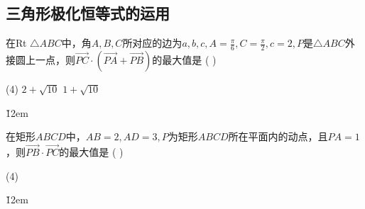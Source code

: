 \subsection{三角形极化恒等式的运用}

\begin{example}
    在Rt $\triangle ABC$中，角$A, B, C$所对应的边为$a, b, c, A = \frac{\pi}{6}, C = \frac{\pi}{2}, c=2, P$是$\triangle ABC$外接圆上一点，则$\overrightarrow{PC} \cdot (\overrightarrow{PA} + \overrightarrow{PB})$的最大值是 ( \hspace{1.5cm} )
    \begin{tasks}(4)
        \task $2+\sqrt{10}$
        \task $1+\sqrt{10}$
    \end{tasks}
\end{example}

\v{12em}

\begin{example}
    在矩形$ABCD$中，$AB=2, AD=3, P$为矩形$ABCD$所在平面内的动点，且$PA=1$，则$\overrightarrow{PB} \cdot \overrightarrow{PC}$的最大值是 ( \hspace{1.5cm} )
    \begin{tasks}(4)
    \end{tasks}
\end{example}

\v{12em}

